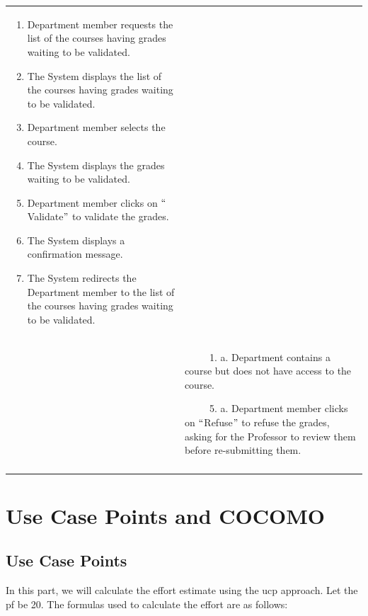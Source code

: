 \documentclass[11pt]{article}
\begin{document}
\begin{table}[H]
\begin{tabular}{p{1.23in}p{4.87in}}
\multicolumn{1}{|p{4.87in}|}{\begin{enumerate}
	\item Department member requests the list of the courses having grades waiting to be validated. \par 	\item The System displays the list of the courses having grades waiting to be validated. \par 	\item Department member selects the course. \par 	\item The System displays the grades waiting to be validated. \par 	\item Department member clicks on $``$Validate$"$  to validate the grades. \par 	\item The System displays a confirmation message. \par 	\item The System redirects the Department member to the list of the courses having grades waiting to be validated.
\end{enumerate}} \\
\hhline{--}
\multicolumn{1}{|p{1.23in}}{Alternate Flow} & 
\multicolumn{1}{|p{4.87in}|}{\ \ \ \ \  1. a. Department contains a course but does not have access to the course. \par \ \ \ \ \  5. a. Department member clicks on $``$Refuse$"$  to refuse the grades, asking for the Professor to review them before re-submitting them.} \\
\hhline{--}

\end{tabular}
 \end{table}

\newpage

\section{Use Case Points and COCOMO}

\subsection{Use Case Points}

In this part, we will calculate the effort estimate using the \gls{ucp} approach. Let the \gls{pf} be 20. The formulas used to calculate the effort are as follows:
\end{document}

